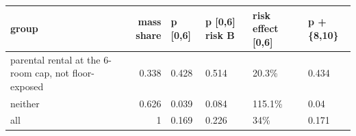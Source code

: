 \begingroup\small
\setlength{\tabcolsep}{3pt}
\renewcommand{\arraystretch}{1.04}
\begin{tabularx}{\linewidth}{XrXXXX}
\toprule
group & mass share & p [0,6] & p [0,6] risk B & risk effect [0,6] & p +\{8,10\} \\
\midrule
parental rental at the 6-room cap, not floor-exposed & 0.338 & 0.428 & 0.514 & 20.3\% & 0.434 \\
neither & 0.626 & 0.039 & 0.084 & 115.1\% & 0.04 \\
all & 1 & 0.169 & 0.226 & 34\% & 0.171 \\
\bottomrule
\end{tabularx}
\endgroup
